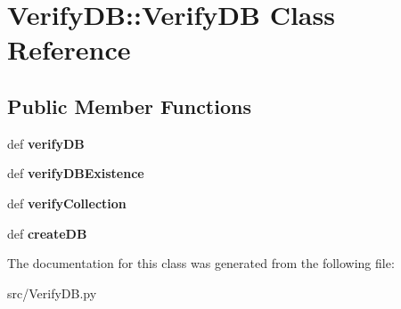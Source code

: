 \hypertarget{classVerifyDB_1_1VerifyDB}{
\section{VerifyDB::VerifyDB Class Reference}
\label{classVerifyDB_1_1VerifyDB}
}
\subsection*{Public Member Functions}
\begin{DoxyCompactItemize}
\item 
\hypertarget{classVerifyDB_1_1VerifyDB_a5b43f43ea2cbeffac03f3be89fce1e28}{
def {\bfseries verifyDB}}
\label{classVerifyDB_1_1VerifyDB_a5b43f43ea2cbeffac03f3be89fce1e28}

\item 
\hypertarget{classVerifyDB_1_1VerifyDB_adc9e063542ea89d5196944ecee1105de}{
def {\bfseries verifyDBExistence}}
\label{classVerifyDB_1_1VerifyDB_adc9e063542ea89d5196944ecee1105de}

\item 
\hypertarget{classVerifyDB_1_1VerifyDB_a77d8c09116390afa9f0559aef066a8b0}{
def {\bfseries verifyCollection}}
\label{classVerifyDB_1_1VerifyDB_a77d8c09116390afa9f0559aef066a8b0}

\item 
\hypertarget{classVerifyDB_1_1VerifyDB_a2a5acef459d6d7505c4fcc4b27941819}{
def {\bfseries createDB}}
\label{classVerifyDB_1_1VerifyDB_a2a5acef459d6d7505c4fcc4b27941819}

\end{DoxyCompactItemize}


The documentation for this class was generated from the following file:\begin{DoxyCompactItemize}
\item 
src/VerifyDB.py\end{DoxyCompactItemize}
